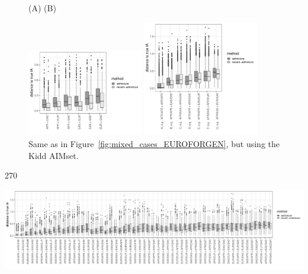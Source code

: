 \documentclass[12pt]{article}
\theoremstyle{definition}
\begin{document}
\begin{figure}[H]
  \hspace{3cm} (A) \hspace{8cm} (B)
  \begin{center}
    \parbox[b]{0.45\textwidth}{\includegraphics[width=0.45\textwidth]{deviations_mixed_Kidd.pdf}\vspace{2cm}}
    \hspace{1cm}
    \parbox[b]{0.45\textwidth}{\includegraphics[width=0.45\textwidth]{deviations_mixed_cases_Kidd.pdf}}
  \end{center}
  \caption{\label{fig:mixed_cases_Kidd} Same as in
    Figure~\ref{fig:mixed_cases_EUROFORGEN}, but using the Kidd
    AIMset.}
\end{figure}

%  

\begin{center}
  \begin{turn}{270}%
    \begin{minipage}{\textheight}
      \includegraphics[width=\textwidth]{deviations_mixed_allcases_Kidd.pdf}
      \label{fig:mixed_allcases_Kidd}
    \end{minipage}
  \end{turn}
\end{center}
\end{document}
